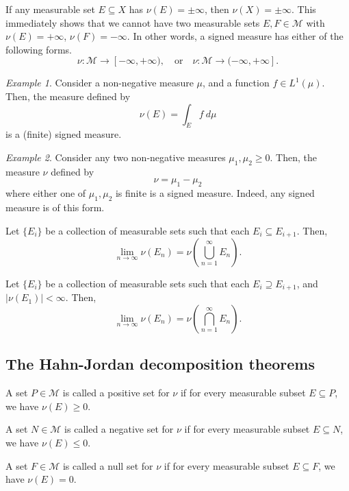 \documentclass[11pt]{article}
\newcommand{\M}{\mathcal{M}}
\theoremstyle{definition}
\theoremstyle{remark}
\newtheorem*{example}{Example}
\begin{document}
    \begin{corollary}
        If any measurable set $E\subseteq X$ has $\nu(E) = \pm\infty$, then $\nu(X) =
        \pm\infty$. This immediately shows that we cannot have two measurable sets
        $E, F \in \M$ with $\nu(E) = +\infty$, $\nu(F) = -\infty$. In other words, a
        signed measure has either of the following forms. \[
            \nu\colon \M \to [-\infty, +\infty), \quad\text{or}\quad
            \nu\colon \M \to (-\infty, +\infty].
        \]
    \end{corollary}

    \begin{example}
        Consider a non-negative measure $\mu$, and a function $f\in L^1(\mu)$. Then,
        the measure defined by \[
            \nu(E) = \int_E f\:d\mu
        \] is a (finite) signed measure.
    \end{example}
    \begin{example}
        Consider any two non-negative measures $\mu_1, \mu_2 \geq 0$. Then, the
        measure $\nu$ defined by \[
            \nu = \mu_1 - \mu_2
        \] where either one of $\mu_1, \mu_2$ is finite is a signed measure. Indeed,
        any signed measure is of this form.
    \end{example}

    \begin{lemma}
        Let $\{E_i\}$ be a collection of measurable sets such that each $E_i
        \subseteq E_{i + 1}$. Then, \[
            \lim_{n \to \infty} \nu(E_n) = \nu\left(\bigcup_{n = 1}^\infty
            E_n\right).
        \]
    \end{lemma}

    \begin{lemma}
        Let $\{E_i\}$ be a collection of measurable sets such that each $E_i
        \supseteq E_{i + 1}$, and $|\nu(E_1)| < \infty$. Then, \[
            \lim_{n \to \infty} \nu(E_n) = \nu\left(\bigcap_{n = 1}^\infty
            E_n\right).
        \]
    \end{lemma}

    \subsection{The Hahn-Jordan decomposition theorems}

    \begin{definition}
        A set $P \in \M$ is called a positive set for $\nu$ if for every measurable
        subset $E \subseteq P$, we have $\nu(E) \geq 0$.
    \end{definition}
    \begin{definition}
        A set $N \in \M$ is called a negative set for $\nu$ if for every measurable
        subset $E \subseteq N$, we have $\nu(E) \leq 0$.
    \end{definition}
    \begin{definition}
        A set $F \in \M$ is called a null set for $\nu$ if for every measurable
        subset $E \subseteq F$, we have $\nu(E) = 0$.
    \end{definition}
\end{document}
